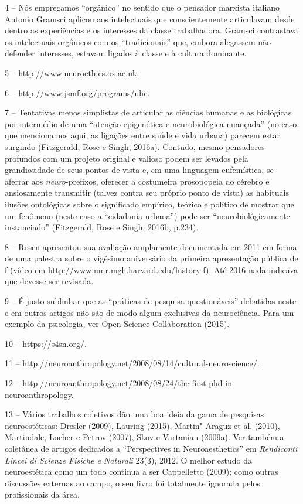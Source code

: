 4 -- Nós empregamos ``orgânico'' no sentido que o pensador marxista
italiano Antonio Gramsci aplicou aos intelectuais que conscientemente
articulavam desde dentro as experiências e os interesses da classe
trabalhadora. Gramsci contrastava os intelectuais orgânicos com os
``tradicionais'' que, embora alegassem não defender interesses, estavam
ligados à classe e à cultura dominante.

5 -- http://www.neuroethics.ox.ac.uk.

6 -- http://www.jsmf.org/programs/uhc.

7 -- Tentativas menos simplistas de articular as ciências humanas e as
biológicas por intermédio de uma ``atenção epigenética e neurobiológica
nuançada'' (no caso que mencionamos aqui, as ligações entre saúde e vida
urbana) parecem estar surgindo (Fitzgerald, Rose e Singh, 2016a).
Contudo, mesmo pensadores profundos com um projeto original e valioso
podem ser levados pela grandiosidade de seus pontos de vista e, em uma
linguagem eufemística, se aferrar aos \emph{neuro}-prefixos, oferecer a
costumeira prosopopeia do cérebro e ansiosamente transmitir (talvez
contra seu próprio ponto de vista) as habituais ilusões ontológicas
sobre o significado empírico, teórico e político de mostrar que um
fenômeno (neste caso a ``cidadania urbana'') pode ser
``neurobiológicamente instanciado'' (Fitzgerald, Rose e Singh, 2016b,
p.234).

8 -- Rosen apresentou sua avaliação amplamente documentada em 2011 em
forma de uma palestra sobre o vigésimo aniversário da primeira
apresentação pública de f (vídeo em
http://www.nmr.mgh.harvard.edu/history-f). Até 2016 nada indicava que
devesse ser revisada.

9 -- É justo sublinhar que as ``práticas de pesquisa questionáveis''
debatidas neste e em outros artigos não são de modo algum exclusivas da
neurociência. Para um exemplo da psicologia, ver Open Science
Collaboration (2015).

10 -- https://s4sn.org/.

11 -- http://neuroanthropology.net/2008/08/14/cultural-neuroscience/.

12 --
http://neuroanthropology.net/2008/08/24/the-first-phd-in-neuroanthropology.

13 -- Vários trabalhos coletivos dão uma boa ideia da gama de pesquisas
neuroestéticas: Dresler (2009), Lauring (2015), Martin"-Araguz et al.
(2010), Martindale, Locher e Petrov (2007), Skov e Vartanian (2009a).
Ver também a coletânea de artigos dedicados a ``Perspectives in
Neuroaesthetics'' em \emph{Rendiconti Lincei di Scienze Fisiche e
Naturali} 23(3), 2012. O melhor estudo da neuroestética como um todo
continua a ser Cappelletto (2009); como outras discussões externas ao
campo, o seu livro foi totalmente ignorada pelos profissionais da área.


